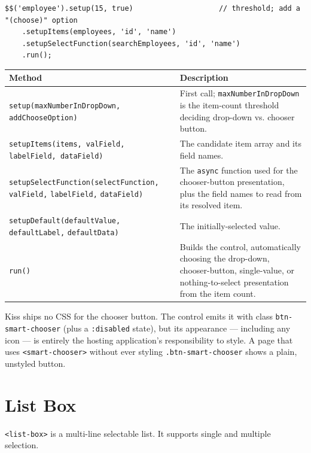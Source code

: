 \begin{lstlisting}[style=javascript]
$$('employee').setup(15, true)                    // threshold; add a "(choose)" option
    .setupItems(employees, 'id', 'name')
    .setupSelectFunction(searchEmployees, 'id', 'name')
    .run();
\end{lstlisting}

\begin{longtable}{P{4.8cm}P{5.7cm}}
\toprule
\textbf{Method} & \textbf{Description} \\
\midrule
\endhead
\texttt{setup(}\allowbreak\texttt{maxNumberInDropDown,} \texttt{addChooseOption)} & First call; \texttt{maxNumberInDropDown} is the item-count threshold deciding drop-down vs. chooser button. \\
\texttt{setupItems(items, valField, labelField, dataField)} & The candidate item array and its field names. \\
\texttt{setupSelectFunction(}\allowbreak\texttt{selectFunction,} \texttt{valField,} \texttt{labelField,} \texttt{dataField)} & The \texttt{async} function used for the chooser-button presentation, plus the field names to read from its resolved item. \\
\texttt{setupDefault(}\allowbreak\texttt{defaultValue,} \texttt{defaultLabel,} \texttt{defaultData)} & The initially-selected value. \\
\texttt{run()} & Builds the control, automatically choosing the drop-down, chooser-button, single-value, or nothing-to-select presentation from the item count. \\
\bottomrule
\end{longtable}

\begin{warnbox}
Kiss ships no CSS for the chooser button.  The control emits it with class \texttt{btn-smart-chooser} (plus a \texttt{:disabled} state), but its appearance --- including any icon --- is entirely the hosting application's responsibility to style.  A page that uses \texttt{<smart-chooser>} without ever styling \texttt{.btn-smart-chooser} shows a plain, unstyled button.
\end{warnbox}

\section{List Box}
\label{sec:comp-listbox}

\texttt{<list-box>} is a multi-line selectable list.  It supports single and multiple selection.

